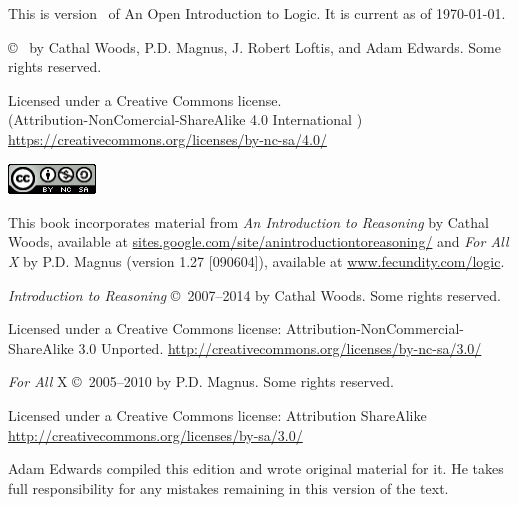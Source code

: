 \thispagestyle{empty}
This is version \version~of An Open Introduction to Logic. It is current as of \today. %

\vfill

{\copyright\  by Cathal Woods, P.D. Magnus, J. Robert Loftis, and Adam Edwards. Some rights reserved. }

\begin{adjustwidth}{2em}{0em}
{\footnotesize Licensed under a Creative Commons license.\\
	(Attribution-NonComercial-ShareAlike 4.0 International )
	\url{https://creativecommons.org/licenses/by-nc-sa/4.0/}


\includegraphics[width=66pt, height=23pt, keepaspectratio=true]{img/cc-by-nc-sa.png}

}

\end{adjustwidth}

\vfill

This book incorporates material from \emph{An Introduction to Reasoning} by Cathal Woods, available at \url{sites.google.com/site/anintroductiontoreasoning/}
and \emph{For All X} by P.D. Magnus (version 1.27 [090604]), available at \url{www.fecundity.com/logic}.


\textit{Introduction to Reasoning} \copyright\ 2007--2014 by Cathal Woods. Some rights reserved.

\begin{adjustwidth}{2em}{0em}
{\footnotesize Licensed under a Creative Commons license: Attribution-NonCommercial-ShareAlike 3.0 Unported. \url{http://creativecommons.org/licenses/by-nc-sa/3.0/}}
\end{adjustwidth}

\textit{For All} X \copyright\  2005--2010 by P.D. Magnus. Some rights reserved.

\begin{adjustwidth}{2em}{0em}
{\footnotesize Licensed under a Creative Commons license: Attribution ShareAlike \url{http://creativecommons.org/licenses/by-sa/3.0/}}
\end{adjustwidth}

\vfill

Adam Edwards compiled this edition and wrote original material for it. He takes full responsibility for any mistakes remaining in this version of the text.


